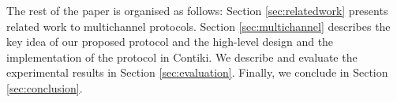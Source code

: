 The rest of the paper is organised as follows: Section \ref{sec:relatedwork} presents related work to multichannel protocols. Section \ref{sec:multichannel} describes the key idea of our proposed protocol and the high-level design and the implementation of the protocol in Contiki. We describe and evaluate the experimental results in Section \ref{sec:evaluation}. Finally, we conclude in Section \ref{sec:conclusion}.
